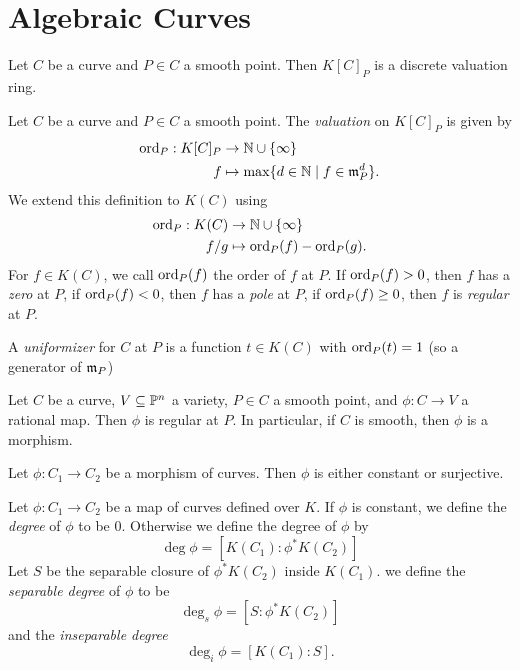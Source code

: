 \section{Algebraic Curves}

\begin{proposition}
	Let $C$ be a curve and $P \in C$ a smooth point.
	Then $K[C]_P$ is a discrete valuation ring.
\end{proposition}

\begin{definition}
	Let $C$ be a curve and $P \in C$ a smooth point. The \emph{valuation}
	on $K[C]_P$ is given by
	\begin{align*}
		\operatorname{ord}_P: K[C]_P &\to \mathbb{N}\cup\{\infty\}\\
		f &\mapsto \max\{d \in \mathbb{N} \mid f \in \mathfrak{m}_P^d\}.
	\end{align*}
	We extend this definition to $K(C)$ using
	\begin{align*}
		\operatorname{ord}_P: K(C) &\to \mathbb{N}\cup\{\infty\}\\
		f/g &\mapsto \operatorname{ord}_P(f) - \operatorname{ord}_P(g).
	\end{align*}
	For $f \in K(C)$, we call $\operatorname{ord}_P(f)$ the order of $f$ at $P$.
	If $\operatorname{ord}_P(f) > 0$, then $f$ has a \emph{zero} at $P$,
	if $\operatorname{ord}_P(f) < 0$, then $f$ has a \emph{pole} at $P$,
	if $\operatorname{ord}_P(f) \geq 0$, then $f$ is \emph{regular} at $P$.
	
	A \emph{uniformizer} for $C$ at $P$ is a function $t \in K(C)$ with
	$\operatorname{ord}_P(t) = 1$ (so a generator of $\mathfrak{m}_P$)
\end{definition}

\begin{proposition}
	Let $C$ be a curve, $V \subseteq \mathbb{P}^n$ a variety,
	$P \in C$ a smooth point, and $\phi: C \to V$ a rational map.
	Then $\phi$ is regular at $P$. In particular, if $C$ is smooth, 
	then $\phi$ is a morphism.
\end{proposition}

\begin{theorem}
	Let $\phi: C_1 \to C_2$ be a morphism of curves. Then $\phi$ is either
	constant or surjective.
\end{theorem}

\begin{definition}
	Let $\phi: C_1 \to C_2$ be a map of curves defined over $K$.
	If $\phi$ is constant, we define the \emph{degree} of $\phi$ to be $0$.
	Otherwise we define the degree of $\phi$ by
	\begin{equation*}
		\deg\phi = [K(C_1): \phi^*K(C_2)]
	\end{equation*}
	Let $S$ be the separable closure of $\phi^*K(C_2)$ inside $K(C_1)$.
	we define the \emph{separable degree} of $\phi$ to be
	\begin{equation*}
		\deg_s\phi = [S: \phi^*K(C_2)]
	\end{equation*}
	and the \emph{inseparable degree}
	\begin{equation*}
		\deg_i\phi = [K(C_1): S].
	\end{equation*}
\end{definition}

